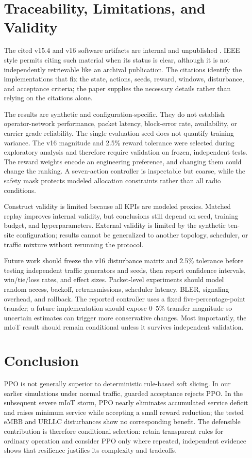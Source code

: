 \documentclass[conference]{IEEEtran}
\begin{document}
\section{Traceability, Limitations, and Validity}
The cited v15.4 and v16 software artifacts are internal and unpublished \cite{ranslice154,ranslice16}. IEEE style permits citing such material when its status is clear, although it is not independently retrievable like an archival publication. The citations identify the implementations that fix the state, actions, seeds, reward, windows, disturbance, and acceptance criteria; the paper supplies the necessary details rather than relying on the citations alone.

The results are synthetic and configuration-specific. They do not establish operator-network performance, packet latency, block-error rate, availability, or carrier-grade reliability. The single evaluation seed does not quantify training variance. The v16 magnitude and 2.5\% reward tolerance were selected during exploratory analysis and therefore require validation on frozen, independent tests. The reward weights encode an engineering preference, and changing them could change the ranking. A seven-action controller is inspectable but coarse, while the safety mask protects modeled allocation constraints rather than all radio conditions.

Construct validity is limited because all KPIs are modeled proxies. Matched replay improves internal validity, but conclusions still depend on seed, training budget, and hyperparameters. External validity is limited by the synthetic ten-site configuration; results cannot be generalized to another topology, scheduler, or traffic mixture without rerunning the protocol.

Future work should freeze the v16 disturbance matrix and 2.5\% tolerance before testing independent traffic generators and seeds, then report confidence intervals, win/tie/loss rates, and effect sizes. Packet-level experiments should model random access, backoff, retransmissions, scheduler latency, BLER, signaling overhead, and rollback. The reported controller uses a fixed five-percentage-point transfer; a future implementation should expose 0--5\% transfer magnitude so uncertain estimates can trigger more conservative changes. Most importantly, the mIoT result should remain conditional unless it survives independent validation.

\section{Conclusion}
PPO is not generally superior to deterministic rule-based soft slicing. In our earlier simulations under normal traffic, guarded acceptance rejects PPO. In the subsequent severe mIoT storm, PPO nearly eliminates accumulated service deficit and raises minimum service while accepting a small reward reduction; the tested eMBB and URLLC disturbances show no corresponding benefit. The defensible contribution is therefore conditional selection: retain transparent rules for ordinary operation and consider PPO only where repeated, independent evidence shows that resilience justifies its complexity and tradeoffs.
\end{document}
